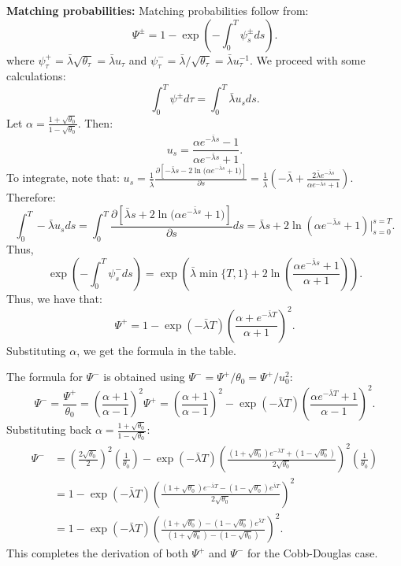 \textbf{Matching probabilities:} Matching probabilities follow from:
\[
\Psi^{\pm} = 1 - \exp\left(-\int_0^T \psi^{\pm}_s ds\right).
\]
where $\psi^+_{\tau} = \bar{\lambda}\sqrt{\theta_{\tau}}=\bar{\lambda}u_{\tau}$ and $\psi^-_{\tau} = \bar{\lambda}/\sqrt{\theta_{\tau}}=\bar{\lambda}u^{-1}_{\tau}$. We proceed with some calculations:
\[
\int_0^T \psi^{\pm}d\tau=\int_0^T \bar{\lambda}u_s ds. 
\]
Let $\alpha =\frac{ 1+\sqrt{\theta_0}}{ 1-\sqrt{\theta_0}}.$ Then:
\[
u_s = \frac{\alpha e^{-\bar{\lambda}s} - 1}{\alpha e^{-\bar{\lambda}s} + 1}.
\]
To integrate, note that:
$u_s = \frac{1}{\bar{\lambda}}\frac{\partial [-\bar{\lambda}s-2\ln({\alpha e^{-\bar{\lambda}s} + 1)}]}{\partial s}=\frac{1}{\bar{\lambda}}(-\bar{\lambda}+\frac{2\bar{\lambda}e^{-\bar{\lambda}s}}{\alpha e^{-\bar{\lambda}s} + 1}).$
Therefore:
\[
\int_0^T-\bar{\lambda} u_s ds = \int_0^T \frac{\partial [\bar{\lambda}s+2\ln({\alpha e^{-\bar{\lambda}s} + 1)}]}{\partial s} ds=  \bar{\lambda}s+2\ln(\alpha e^{-\bar{\lambda}s}+1)|^{s=T}_{s=0}.
\]
Thus, 
\[
\exp\left(-\int_0^T \psi^{-}_s ds\right)=\exp\left(\bar{\lambda}\min\{T,1\}+2\ln\left(\frac{\alpha e^{-\bar{\lambda}s}+1}{\alpha+1}\right)\right).
\]
Thus, we have that:
\[
\Psi^{+}=1-\exp(-\bar{\lambda}T)\left(\frac{\alpha +e^{-\bar{\lambda}T}}{\alpha+1}\right)^2.
\]
Substituting $\alpha$, we get the formula in the table. 

The formula for $\Psi^-$ is obtained using $\Psi^-=\Psi^{+}/\theta_0=\Psi^{+}/u^2_0$:
\[
\Psi^- = \frac{\Psi^+}{\theta_0} = \left(\frac{\alpha+1}{\alpha-1}\right)^2 \Psi^+
= \left(\frac{\alpha+1}{\alpha-1}\right)^2 - \exp(-\bar{\lambda}T)\left(\frac{\alpha e^{-\bar{\lambda}T}+1}{\alpha-1}\right)^2.
\]
Substituting back $\alpha = \frac{1+\sqrt{\theta_0}}{1-\sqrt{\theta_0}}$:
\begin{align*}
\Psi^- &= \left(\frac{2\sqrt{\theta_0}}{2}\right)^2\left(\frac{1}{\theta_0}\right) - \exp(-\bar{\lambda}T)\left(\frac{(1+\sqrt{\theta_0})e^{-\bar{\lambda}T} + (1-\sqrt{\theta_0})}{2\sqrt{\theta_0}}\right)^2\left(\frac{1}{\theta_0}\right)\\
&= 1 - \exp(-\bar{\lambda}T)\left(\frac{(1+\sqrt{\theta_0})e^{-\bar{\lambda}T} - (1-\sqrt{\theta_0})e^{\bar{\lambda}T}}{2\sqrt{\theta_0}}\right)^2\\
&= 1 - \exp(-\bar{\lambda}T)\left(\frac{(1+\sqrt{\theta_0}) - (1-\sqrt{\theta_0})e^{\bar{\lambda}T}}{(1+\sqrt{\theta_0}) - (1-\sqrt{\theta_0})}\right)^2.
\end{align*}
This completes the derivation of both $\Psi^+$ and $\Psi^-$ for the Cobb-Douglas case.

